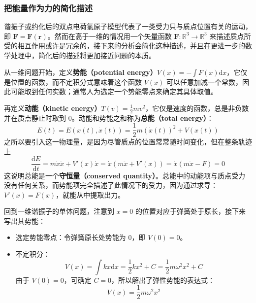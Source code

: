 \documentclass[cn,10pt,math=newtx,citestyle=gb7714-2015,bibstyle=gb7714-2015]{elegantbook}
\def\bm{\boldsymbol}
\def\d{\mathrm d}
\def\R{\mathbb R}
\def\ra{\rightarrow}
\begin{document}
\subsubsection{把能量作为力的简化描述}
谐振子或约化后的双点电荷氢原子模型代表了一类受力只与质点位置有关的运动，即 $\bm F=\bm F(\bm r)$。然而在高于一维的情况用一个矢量函数 $\bm F:\R^3\ra\R^3$ 来描述质点所受的相互作用或许是冗余的，接下来的分析会简化这种描述，并且在更进一步的数学处理中，简化后的描述将更加接近问题的本质。

从一维问题开始，定义\textbf{势能（potential energy）}$V(x) = -\int F(x)\d x$，它仅是位置的函数，而不定积分式意味着这个函数 $V(x)$ 可以任意加减一个常数，因此可能取到任何实数；通常人为选定一个势能零点来确定其具体取值。

再定义\textbf{动能（kinetic energy）}$T(v)=\frac{1}{2}m v^2$，它仅是速度的函数，总是非负数并在质点静止时取到 0。动能和势能之和称为\textbf{总能（total energy）}：
\begin{equation*}
    E(t) = E(x(t),\dot x(t))=\frac{1}{2}m(\dot x(t))^2+V(x(t))
\end{equation*}
之所以要引入这一物理量，是因为尽管质点的位置常常随时间变化，但在整条轨迹上
\begin{equation*}
    \frac{\d E}{\d t}=m\dot x\ddot x+V'(x)\dot x=\dot x(m\ddot x+V'(x))=\dot x(m\ddot x-F)=0
\end{equation*}
这说明总能是一个\textbf{守恒量（conserved quantity）}。总能中的动能项与质点受力没有任何关系，而势能项完全描述了此情况下的受力，因为通过求导： $V'(x)=F(x)$，就能从中提取出力。

\begin{instance}[一维谐振子势]
    回到一维谐振子的单体问题，注意到 $x=0$ 的位置对应于弹簧处于原长，接下来写出其势能：
    \begin{itemize}
        \item 选定势能零点：令弹簧原长处势能为 0，即 $V(0)=0$。
        \item 不定积分：
        \begin{equation*}
            V(x) = \int kx\d x=\frac{1}{2}kx^2+C=\frac{1}{2}m\omega^2x^2+C
        \end{equation*}
        由于 $V(0)=0$，可确定 $C=0$，所以解出了弹性势能的表达式：
        \begin{equation*}
            V(x) = \frac{1}{2}m\omega^2x^2
        \end{equation*}
    \end{itemize}
\end{instance}
\end{document}
